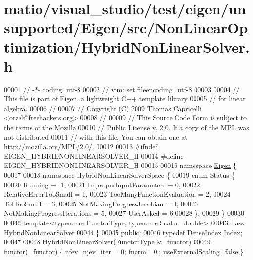 \hypertarget{matio_2visual__studio_2test_2eigen_2unsupported_2_eigen_2src_2_non_linear_optimization_2_hybrid_non_linear_solver_8h_source}{}\section{matio/visual\+\_\+studio/test/eigen/unsupported/\+Eigen/src/\+Non\+Linear\+Optimization/\+Hybrid\+Non\+Linear\+Solver.h}
\label{matio_2visual__studio_2test_2eigen_2unsupported_2_eigen_2src_2_non_linear_optimization_2_hybrid_non_linear_solver_8h_source}

\begin{DoxyCode}
00001 \textcolor{comment}{// -*- coding: utf-8}
00002 \textcolor{comment}{// vim: set fileencoding=utf-8}
00003 
00004 \textcolor{comment}{// This file is part of Eigen, a lightweight C++ template library}
00005 \textcolor{comment}{// for linear algebra.}
00006 \textcolor{comment}{//}
00007 \textcolor{comment}{// Copyright (C) 2009 Thomas Capricelli <orzel@freehackers.org>}
00008 \textcolor{comment}{//}
00009 \textcolor{comment}{// This Source Code Form is subject to the terms of the Mozilla}
00010 \textcolor{comment}{// Public License v. 2.0. If a copy of the MPL was not distributed}
00011 \textcolor{comment}{// with this file, You can obtain one at http://mozilla.org/MPL/2.0/.}
00012 
00013 \textcolor{preprocessor}{#ifndef EIGEN\_HYBRIDNONLINEARSOLVER\_H}
00014 \textcolor{preprocessor}{#define EIGEN\_HYBRIDNONLINEARSOLVER\_H}
00015 
00016 \textcolor{keyword}{namespace }\hyperlink{namespace_eigen}{Eigen} \{ 
00017 
00018 \textcolor{keyword}{namespace }HybridNonLinearSolverSpace \{ 
00019     \textcolor{keyword}{enum} Status \{
00020         Running = -1,
00021         ImproperInputParameters = 0,
00022         RelativeErrorTooSmall = 1,
00023         TooManyFunctionEvaluation = 2,
00024         TolTooSmall = 3,
00025         NotMakingProgressJacobian = 4,
00026         NotMakingProgressIterations = 5,
00027         UserAsked = 6
00028     \};
00029 \}
00030 
00042 \textcolor{keyword}{template}<\textcolor{keyword}{typename} FunctorType, \textcolor{keyword}{typename} Scalar=\textcolor{keywordtype}{double}>
00043 \textcolor{keyword}{class }HybridNonLinearSolver
00044 \{
00045 \textcolor{keyword}{public}:
00046     \textcolor{keyword}{typedef} DenseIndex \hyperlink{namespace_eigen_a62e77e0933482dafde8fe197d9a2cfde}{Index};
00047 
00048     HybridNonLinearSolver(FunctorType &\_functor)
00049         : functor(\_functor) \{ nfev=njev=iter = 0;  fnorm= 0.; useExternalScaling=\textcolor{keyword}{false};\}

\end{DoxyCode}

